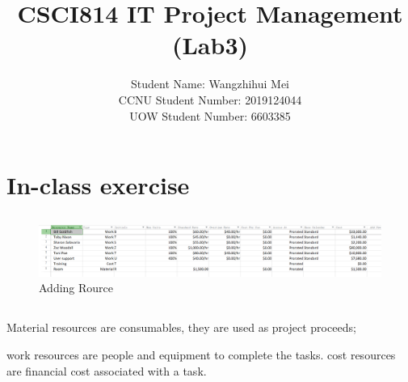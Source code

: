 \documentclass[runningheads]{llncs}
\begin{document}
\title{\large{CSCI814 IT Project Management (Lab3)}}

%
%
\author{\large{Student Name: Wangzhihui Mei \\ %
CCNU Student Number: 2019124044 \\ %
UOW Student Number: 6603385}}  %







\maketitle
\clearpage


\section{In-class exercise}
\subsection{}
\begin{figure}[H]
    \centering
    \includegraphics[width=1.0\textwidth]{./image/f1}
    \caption{Adding Rource}
\end{figure}
\subsection{}
Material resources are consumables, they are used as project proceeds;

work resources are people and equipment to complete the tasks. cost resources are financial cost associated with a task.
\end{document}
